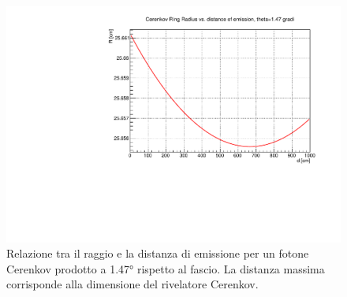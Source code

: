\documentclass[8pt]{extarticle}
\begin{document}
\begin{figure}
\begin{center}
\includegraphics[scale=0.4]{tf1_ringdistance}
\caption{Relazione tra il raggio e la distanza di emissione per un fotone Cerenkov prodotto a 1.47° rispetto al fascio. La distanza massima corrisponde alla dimensione del rivelatore Cerenkov.}
\label{tf1_ringdistance}
\end{center}
\end{figure}
\end{document}
